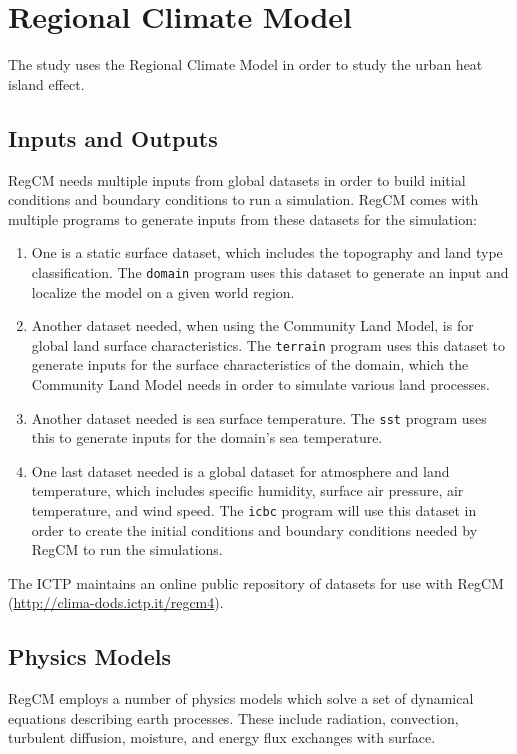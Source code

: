 \section{Regional Climate Model}
	The study uses the Regional Climate Model in order to study the urban heat island effect.
	
	\subsection{Inputs and Outputs}
		RegCM needs multiple inputs from global datasets in order to build initial conditions and boundary conditions to run a simulation. RegCM comes with multiple programs to generate inputs from these datasets for the simulation:
		\begin{enumerate}
			\item One is a static surface dataset, which includes the topography and land type classification. 
				The \texttt{domain} program uses this dataset to generate an input and localize the model on a given world region.
			\item Another dataset needed, when using the Community Land Model, is for global land surface characteristics.
				The \texttt{terrain} program uses this dataset to generate inputs for the surface characteristics of the domain, which the Community Land Model needs in order to simulate various land processes.
			\item Another dataset needed is sea surface temperature.
				The \texttt{sst} program uses this to generate inputs for the domain's sea temperature.
			\item One last dataset needed is a global dataset for atmosphere and land temperature, which includes specific humidity, surface air pressure, air temperature, and wind speed.
				The \texttt{icbc} program will use this dataset in order to create the initial conditions and boundary conditions needed by RegCM to run the simulations.
		\end{enumerate}
		The ICTP maintains an online public repository of datasets for use with RegCM (\url{http://clima-dods.ictp.it/regcm4}).
	
	\subsection{Physics Models}
		RegCM employs a number of physics models which solve a set of dynamical equations describing earth processes.
		These include radiation, convection, turbulent diffusion, moisture, and energy flux exchanges with surface.
		
